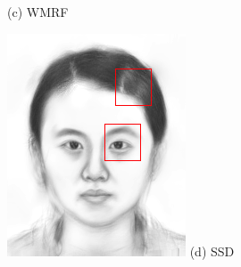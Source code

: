 \documentclass[10pt,twocolumn,letterpaper]{article}
\begin{document}
\begin{figure}[t]
\begin{minipage}[t]{0.24\linewidth}
(c) WMRF\cite{zhou2012markov}
\end{minipage}
\begin{minipage}[t]{0.24\linewidth}
\centering
\includegraphics[width=1\linewidth]{img/example_ssd.png}
(d) SSD\cite{song2014real}
\end{minipage}
\begin{minipage}[t]{0.24\linewidth}
\centering

\end{minipage}
\end{figure}
\end{document}
